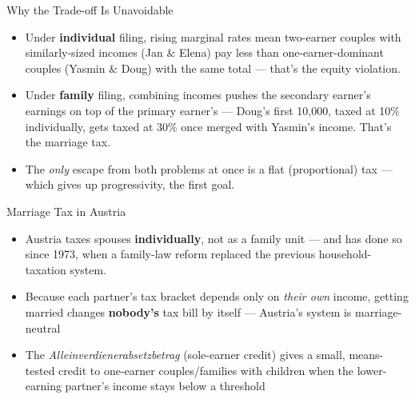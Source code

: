 \documentclass[11pt,aspectratio=169]{beamer}
\begin{document}
\begin{frame}{Why the Trade-off Is Unavoidable}
	\small
	\begin{itemize}
		\item Under \textbf{individual} filing, rising marginal rates mean two-earner couples with similarly-sized incomes (Jan \& Elena) pay less than one-earner-dominant couples (Yasmin \& Doug) with the same total --- that's the equity violation.
		\item Under \textbf{family} filing, combining incomes pushes the secondary earner's earnings on top of the primary earner's --- Doug's first \texteuro{}10{,}000, taxed at 10\% individually, gets taxed at 30\% once merged with Yasmin's income. That's the marriage tax.
		\item The \emph{only} escape from both problems at once is a flat (proportional) tax --- which gives up progressivity, the first goal.
	\end{itemize}
	\vspace{0.3em}
	\centering

\end{frame}



\begin{frame}{Marriage Tax in Austria}

	\begin{itemize}
		\item Austria taxes spouses \textbf{individually}, not as a family unit --- and has done so since 1973, when a family-law reform replaced the previous household-taxation system.
		\item Because each partner's tax bracket depends only on \emph{their own} income, getting married changes \textbf{nobody's} tax bill by itself --- Austria's system is marriage-neutral 
	
 
		\item The \emph{Alleinverdienerabsetzbetrag} (sole-earner credit) gives a small, means-tested credit to one-earner couples/families with children when the lower-earning partner's income stays below a threshold 
 
\end{itemize}
\end{frame}
\end{document}
